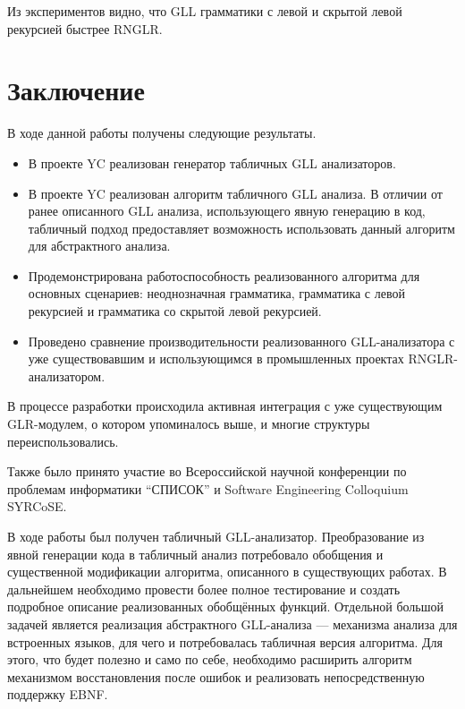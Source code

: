 \documentclass{matmex-diploma-custom}
\begin{document}
Из экспериментов видно, что GLL грамматики с левой и скрытой левой рекурсией быстрее RNGLR.

\section*{Заключение}
В ходе данной работы получены следующие результаты.
\begin{itemize}
\item В проекте YC реализован генератор табличных GLL анализаторов.
\item В проекте YC реализован алгоритм табличного GLL анализа. В отличии от ранее описанного GLL анализа, использующего явную генерацию в код, табличный подход предоставляет возможность использовать данный алгоритм для абстрактного анализа.
\item Продемонстрирована работоспособность реализованного алгоритма для основных сценариев: неоднозначная грамматика, грамматика с левой рекурсией и грамматика со скрытой левой рекурсией.
\item Проведено сравнение производительности реализованного GLL-анализатора с уже существовавшим и использующимся в промышленных проектах RNGLR-анализатором.
\end{itemize}

В процессе разработки происходила активная интеграция с уже существующим GLR-модулем, о котором упоминалось выше, и многие структуры переиспользовались.

Также было принято участие во Всероссийской научной конференции по проблемам информатики “СПИСОК” и Software Engineering Colloquium SYRCoSE. 

В ходе работы был получен табличный GLL-анализатор. Преобразование из явной генерации кода в табличный анализ потребовало обобщения  и существенной модификации алгоритма, описанного в существующих работах. В дальнейшем необходимо провести более полное тестирование и создать подробное описание реализованных обобщённых функций. 
Отдельной большой задачей является реализация абстрактного GLL-анализа — механизма анализа для встроенных языков, для чего и потребовалась табличная версия алгоритма. Для этого, что будет полезно и само по себе, необходимо расширить алгоритм механизмом восстановления после ошибок и реализовать непосредственную поддержку EBNF.
 


\end{document}
